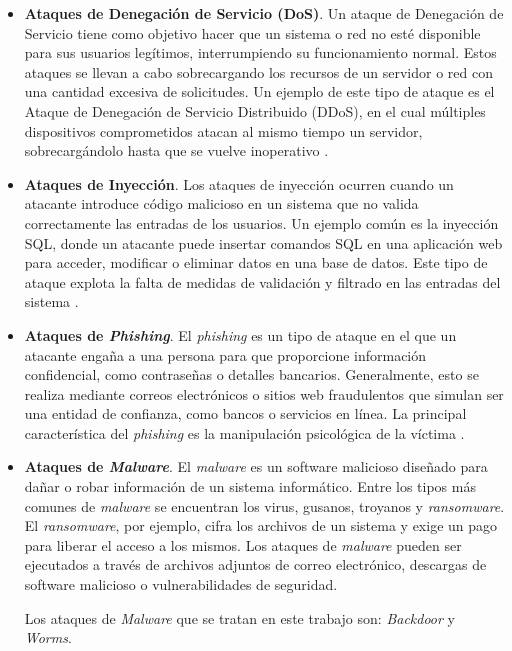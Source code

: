 \begin{itemize}

\item{\textbf{Ataques de Denegación de Servicio (DoS)}}.
Un ataque de Denegación de Servicio tiene como objetivo hacer que un sistema o red no esté disponible para sus usuarios legítimos, interrumpiendo su funcionamiento normal. Estos ataques se llevan a cabo sobrecargando los recursos de un servidor o red con una cantidad excesiva de solicitudes. Un ejemplo de este tipo de ataque es el Ataque de Denegación de Servicio Distribuido (DDoS), en el cual múltiples dispositivos comprometidos atacan al mismo tiempo un servidor, sobrecargándolo hasta que se vuelve inoperativo \cite{tanenbaum2009}.


\item{\textbf{Ataques de Inyección}}.
Los ataques de inyección ocurren cuando un atacante introduce código malicioso en un sistema que no valida correctamente las entradas de los usuarios. Un ejemplo común es la inyección SQL, donde un atacante puede insertar comandos SQL en una aplicación web para acceder, modificar o eliminar datos en una base de datos. Este tipo de ataque explota la falta de medidas de validación y filtrado en las entradas del sistema \cite{scott2015}.

\item{\textbf{Ataques de \textit{Phishing}}}.
El \textit{phishing} es un tipo de ataque en el que un atacante engaña a una persona para que proporcione información confidencial, como contraseñas o detalles bancarios. Generalmente, esto se realiza mediante correos electrónicos o sitios web fraudulentos que simulan ser una entidad de confianza, como bancos o servicios en línea. La principal característica del \textit{phishing} es la manipulación psicológica de la víctima \cite{cissp2018}.

\item{\textbf{Ataques de \textit{Malware}}}.
El \textit{malware} es un software malicioso diseñado para dañar o robar información de un sistema informático. Entre los tipos más comunes de \textit{malware} se encuentran los virus, gusanos, troyanos y \textit{ransomware}. El \textit{ransomware}, por ejemplo, cifra los archivos de un sistema y exige un pago para liberar el acceso a los mismos. Los ataques de \textit{malware} pueden ser ejecutados a través de archivos adjuntos de correo electrónico, descargas de software malicioso o vulnerabilidades de seguridad.

Los ataques de \textit{Malware} que se tratan en este trabajo son: \textit{Backdoor} y \textit{Worms}.


\end{itemize}
